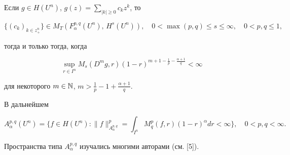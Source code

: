  


\begin{thm} 


Если $g\in H(U^n)$, $g(z)=\sum\limits_{|k|\ge0}c_k z^k$, то 


$$ 


\{(c_k)_{k\in z^n_+}\}\in M_T(F^{p,q}_\alpha(U^n),\,H^s(U^n)),\quad 


0<\max(p,q)\le s\le\infty,\quad 0<p,q\le1, 


$$ 


тогда и только тогда, когда 


\begin{equation} 


\sup_{r\in I^n}M_s(D^m g,r) 


(1-r)^{m+1-\frac{1}{p}-\frac{\alpha+1}{q}}<\infty 


\end{equation} 


для некоторого $m\in\Bbb N$, $m>\frac{1}{p}-1+\frac{\alpha+1}{q}$. 


\end{thm} 


 


В дальнейшем 


$$ 


A^{p,q}_\alpha(U^n)=\bigg\{f\in H(U^n):\|f\|^p_{A^{p,q}_\alpha}= 


\int_{I^n}M^p_q(f,r)(1-r)^\alpha d r<\infty\bigg\},\quad 


0<p,q<\infty.


$$ 


Пространства типа $A^{p,q}_\alpha$ изучались многими авторами (см. [5]). 


 


